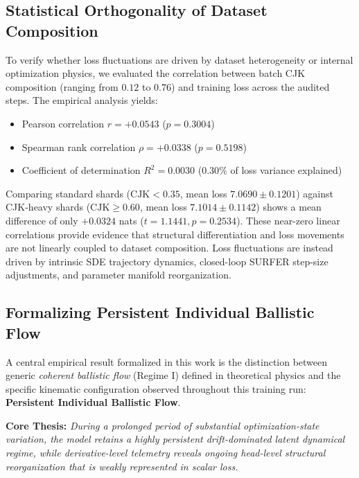 \documentclass[11pt]{article}
\begin{document}
\subsection{Statistical Orthogonality of Dataset Composition}
To verify whether loss fluctuations are driven by dataset heterogeneity or internal optimization physics, we evaluated the correlation between batch CJK composition (ranging from $0.12$ to $0.76$) and training loss across the audited steps. The empirical analysis yields:
\begin{itemize}
    \item Pearson correlation $r = +0.0543$ ($p = 0.3004$)
    \item Spearman rank correlation $\rho = +0.0338$ ($p = 0.5198$)
    \item Coefficient of determination $R^2 = 0.0030$ ($0.30\%$ of loss variance explained)
\end{itemize}
Comparing standard shards ($\text{CJK} < 0.35$, mean loss $7.0690 \pm 0.1201$) against CJK-heavy shards ($\text{CJK} \ge 0.60$, mean loss $7.1014 \pm 0.1142$) shows a mean difference of only $+0.0324$ nats ($t = 1.1441, p = 0.2534$). These near-zero linear correlations provide evidence that structural differentiation and loss movements are not linearly coupled to dataset composition. Loss fluctuations are instead driven by intrinsic SDE trajectory dynamics, closed-loop SURFER step-size adjustments, and parameter manifold reorganization.

\subsection{Formalizing Persistent Individual Ballistic Flow}
A central empirical result formalized in this work is the distinction between generic \textit{coherent ballistic flow} (Regime I) defined in theoretical physics and the specific kinematic configuration observed throughout this training run: \textbf{Persistent Individual Ballistic Flow}.

\textbf{Core Thesis:} \textit{During a prolonged period of substantial optimization-state variation, the model retains a highly persistent drift-dominated latent dynamical regime, while derivative-level telemetry reveals ongoing head-level structural reorganization that is weakly represented in scalar loss.}
\end{document}
